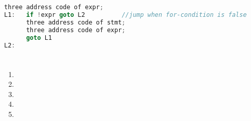 \documentclass[a4paper,10pt]{scrartcl}
\begin{document}
\section{}
\begin{lstlisting}[language=Java]
	  three address code of expr;
L1:   if !expr goto L2      	//jump when for-condition is false
      three address code of stmt;
	  three address code of expr;
      goto L1
L2:
\end{lstlisting}
\section{}
\begin{enumerate}
\item   
\item   
\item   
\item   
\item   
\end{enumerate}
\end{document}
